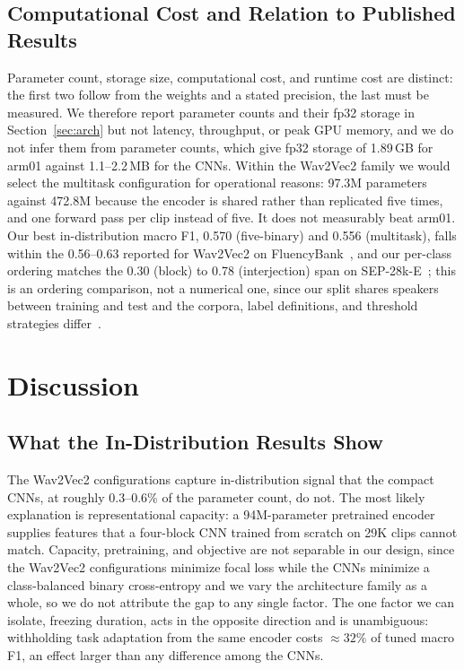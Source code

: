 \documentclass[a4paper,orivec]{llncs}
\begin{document}
\subsection{Computational Cost and Relation to Published Results}
\label{sec:compute}
Parameter count, storage size, computational cost, and runtime cost are distinct:
the first two follow from the weights and a stated precision, the last must be
measured. We therefore report parameter counts and their fp32 storage in
Section~\ref{sec:arch} but not latency, throughput, or peak GPU memory, and we do
not infer them from parameter counts, which give fp32 storage of 1.89\,GB for
arm01 against 1.1--2.2\,MB for the CNNs. Within the Wav2Vec2 family we would
select the multitask configuration for operational reasons: 97.3M parameters
against 472.8M because the encoder is shared rather than replicated five times,
and one forward pass per clip instead of five. It does not measurably beat arm01. Our best in-distribution macro F1, 0.570 (five-binary)
and 0.556 (multitask), falls within the 0.56--0.63 reported for Wav2Vec2 on
FluencyBank~\cite{bayerl2022multi}, and our per-class ordering matches the 0.30
(block) to 0.78 (interjection) span on SEP-28k-E~\cite{susac2026stuttmil}; this is
an ordering comparison, not a numerical one, since our split shares speakers
between training and test and the corpora, label definitions, and threshold
strategies differ~\cite{bayerl2022partitioning}.

\section{Discussion}
\label{sec:discussion}

\subsection{What the In-Distribution Results Show}
The Wav2Vec2 configurations capture in-distribution signal that the compact CNNs,
at roughly 0.3--0.6\% of the parameter count, do not. The most likely explanation
is representational capacity: a 94M-parameter pretrained encoder supplies features
that a four-block CNN trained from scratch on 29K clips cannot match. Capacity,
pretraining, and objective are not separable in our design, since the Wav2Vec2
configurations minimize focal loss while the CNNs minimize a class-balanced binary
cross-entropy and we vary the architecture family as a whole, so we do not
attribute the gap to any single factor. The one factor we can isolate, freezing
duration, acts in the opposite direction and is unambiguous: withholding task
adaptation from the same encoder costs ${\approx}32\%$ of tuned macro F1, an effect
larger than any difference among the CNNs.
\end{document}
